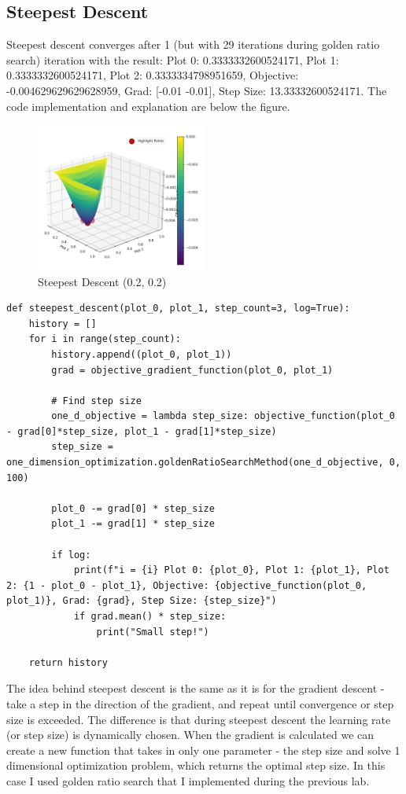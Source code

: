 \documentclass{article}
\begin{document}
        \subsection*{Steepest Descent}
        Steepest descent converges after 1 (but with 29 iterations during golden ratio search) iteration with the result: Plot 0: 0.3333332600524171, Plot 1: 0.3333332600524171, Plot 2: 0.3333334798951659, Objective: -0.004629629629628959, Grad: [-0.01 -0.01], Step Size: 13.33332600524171. The code implementation and explanation are below the figure.
        \begin{figure}[H]
            \centering
            \includegraphics[width=0.5\textwidth]{steepest-02.png}
            \caption{Steepest Descent (0.2, 0.2)}
        \end{figure}
        \begin{verbatim}
def steepest_descent(plot_0, plot_1, step_count=3, log=True):
    history = []
    for i in range(step_count):
        history.append((plot_0, plot_1))
        grad = objective_gradient_function(plot_0, plot_1)

        # Find step size
        one_d_objective = lambda step_size: objective_function(plot_0 - grad[0]*step_size, plot_1 - grad[1]*step_size)
        step_size = one_dimension_optimization.goldenRatioSearchMethod(one_d_objective, 0, 100)
        
        plot_0 -= grad[0] * step_size
        plot_1 -= grad[1] * step_size

        if log:
            print(f"i = {i} Plot 0: {plot_0}, Plot 1: {plot_1}, Plot 2: {1 - plot_0 - plot_1}, Objective: {objective_function(plot_0, plot_1)}, Grad: {grad}, Step Size: {step_size}")
            if grad.mean() * step_size:
                print("Small step!")
        
    return history
        \end{verbatim}
        The idea behind steepest descent is the same as it is for the gradient descent - take a step in the direction of the gradient, and repeat until convergence or step size is exceeded. The difference is that during steepest descent the learning rate (or step size) is dynamically chosen. When the gradient is calculated we can create a new function that takes in only one parameter - the step size and solve 1 dimensional optimization problem, which returns the optimal step size. In this case I used golden ratio search that I implemented during the previous lab.
\end{document}

